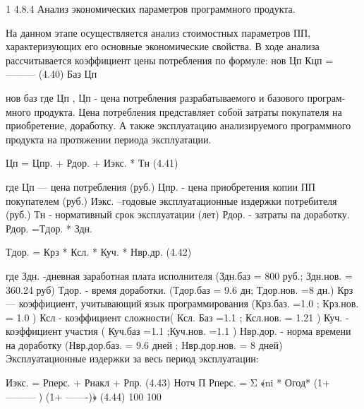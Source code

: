 \begin{ESKDexplanation}
\begin{ESKDexplanation}
\begin{ESKDexplanation}
\begin{ESKDexplanation}
	1	4.8.4 Анализ экономических параметров программного продукта.

На данном этапе осуществляется анализ стоимостных параметров ПП,
характеризующих его основные экономические свойства.
В ходе анализа рассчитывается коэффициент цены потребления по  формуле:
                                    нов
                        Цп
       Кцп   = ---------                                                                                               (4.40)
                           Баз
                         Цп

              нов                  баз
где  Цп       ,          Цп      -  цена потребления разрабатываемого и базового програм-
 много продукта.
Цена потребления представляет собой затраты покупателя на приобретение,
доработку. А также эксплуатацию анализируемого программного продукта
на протяжении периода эксплуатации.

         Цп =  Цпр. +  Рдор. + Иэкс. *  Тн                                                               (4.41)

где  Цп — цена потребления (руб.)
Цпр. - цена приобретения копии ПП покупателем (руб.)
Иэкс. --годовые эксплуатационные издержки потребителя (руб.)
Тн -      нормативный срок эксплуатации (лет)
Рдор. -  затраты па доработку. 
Рдор. =Тдор. * Здн.      

                         Тдор. = Крз * Ксл. * Куч. * Нвр.др.                                           (4.42)

где Здн. -дневная заработная плата исполнителя (Здн.баз = 800 руб.;        
                 Здн.нов. = 360.24 руб)
Тдор. - время доработки. (Тдор.баз = 9.6 дн;   Тдор.нов. =8 дн.)
Крз — коэффициент, учитывающий язык программирования
                      (Крз.баз. =1.0 ;  Крз.нов. = 1.0 )
Ксл -     коэффициент сложности( Ксл. Баз =1.1 ;  Ксл.нов. = 1.21 )
Куч. -  коэффициент участия ( Куч.баз =1.1 ;Куч.нов. =1.1 )
Нвр.дор. - норма времени на доработку (Нвр.дор.баз. = 9.6 дней ;
                                     Нвр.дор.нов. = 8 дней)
Эксплуатационные издержки за весь период эксплуатации:

                        Иэкс. =  Рперс.  +   Рнакл    +    Рпр.                                           (4.43)              
                                                                      Нотч            П
                        Рперс. =  Σ ﴾ni * Огод* (1+    --------- ) (1+ -------)﴿                             (4.44)           
                                                                      100             100


\end{ESKDexplanation}
\end{ESKDexplanation}
\end{ESKDexplanation}
\end{ESKDexplanation}
